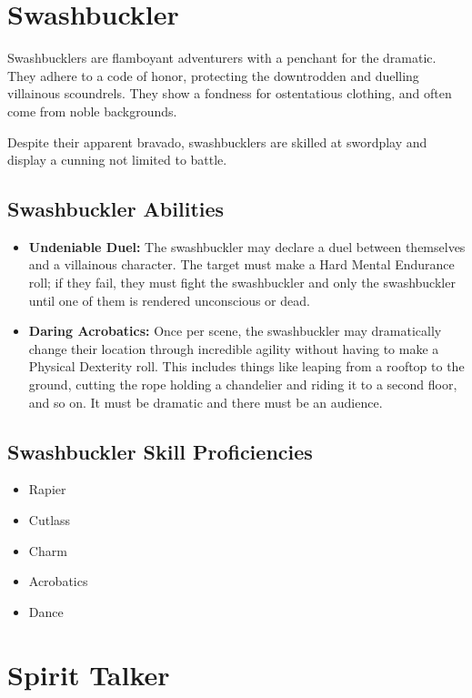 \begin{multicols}{2}
\section{Swashbuckler}

Swashbucklers are flamboyant adventurers with a penchant for the dramatic.
They adhere to a code of honor, protecting the downtrodden and duelling
villainous scoundrels. They show a fondness for ostentatious clothing, and
often come from noble backgrounds.

Despite their apparent bravado, swashbucklers are skilled at swordplay and
display a cunning not limited to battle.

\subsection{Swashbuckler Abilities}

\begin{itemize}
  \item \textbf{Undeniable Duel:} The swashbuckler may declare a duel between
    themselves and a villainous character. The target must make a Hard Mental
    Endurance roll; if they fail, they must fight the swashbuckler and only the
    swashbuckler until one of them is rendered unconscious or dead.
  \item \textbf{Daring Acrobatics:} Once per scene, the swashbuckler may
    dramatically change their location through incredible agility without having
    to make a Physical Dexterity roll. This includes things like leaping from a
    rooftop to the ground, cutting the rope holding a chandelier and riding it to
    a second floor, and so on. It must be dramatic and there must be an audience.
\end{itemize}

\subsection{Swashbuckler Skill Proficiencies}

\begin{itemize}
  \item Rapier
  \item Cutlass
  \item Charm
  \item Acrobatics
  \item Dance
\end{itemize}

\section{Spirit Talker}


\end{multicols}
